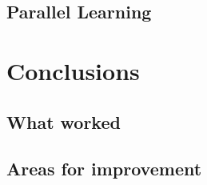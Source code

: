 \subsection{Parallel Learning}

\section{Conclusions}

\subsection{What worked}

\subsection{Areas for improvement}

\pagebreak
%
%